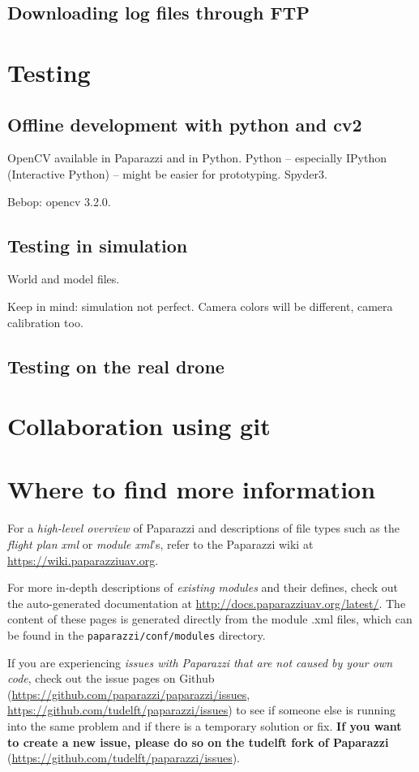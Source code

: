 \documentclass{article}
\begin{document}
\subsection{Downloading log files through FTP}


\section{Testing}
\subsection{Offline development with python and cv2}
OpenCV available in Paparazzi and in Python. Python -- especially IPython (Interactive Python) -- might be easier for prototyping. Spyder3.

Bebop: opencv 3.2.0.

\subsection{Testing in simulation}
World and model files.

Keep in mind: simulation not perfect. Camera colors will be different, camera calibration too.

\subsection{Testing on the real drone}


\section{Collaboration using git}

\section{Where to find more information}
For a \emph{high-level overview} of Paparazzi and descriptions of file types such as the \emph{flight plan xml} or \emph{module xml}'s, refer to the Paparazzi wiki at \url{https://wiki.paparazziuav.org}.

For more in-depth descriptions of \emph{existing modules} and their defines, check out the auto-generated documentation at \url{http://docs.paparazziuav.org/latest/}. The content of these pages is generated directly from the module .xml files, which can be found in the \texttt{paparazzi/conf/modules} directory.

If you are experiencing \emph{issues with Paparazzi that are not caused by your own code}, check out the issue pages on Github (\url{https://github.com/paparazzi/paparazzi/issues}, \url{https://github.com/tudelft/paparazzi/issues}) to see if someone else is running into the same problem and if there is a temporary solution or fix.
\textbf{If you want to create a new issue, please do so on the tudelft fork of Paparazzi} (\url{https://github.com/tudelft/paparazzi/issues}).
\end{document}
